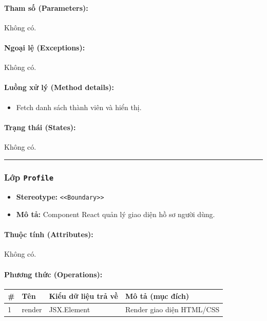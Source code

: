 \documentclass[12pt,a4paper]{article}
\begin{document}
\paragraph{Tham số (Parameters):}
Không có.

\paragraph{Ngoại lệ (Exceptions):}
Không có.

\paragraph{Luồng xử lý (Method details):}
\begin{itemize}[leftmargin=*]
    \item Fetch danh sách thành viên và hiển thị.
\end{itemize}


\paragraph{Trạng thái (States):}
Không có.

\vskip 0.5cm
\noindent\rule{\textwidth}{0.5pt}
\vskip 0.5cm

\subsubsection{Lớp \texttt{Profile}}
\begin{itemize}[leftmargin=*]
    \item \textbf{Stereotype:} \texttt{\textless{}\textless{}Boundary\textgreater{}\textgreater{}}
    \item \textbf{Mô tả:} Component React quản lý giao diện hồ sơ người dùng.
\end{itemize}

\paragraph{Thuộc tính (Attributes):}
Không có.

\paragraph{Phương thức (Operations):}
\begin{longtable}{|p{0.6cm}|p{3.8cm}|p{2.6cm}|p{6.5cm}|}
\hline
\textbf{\#} & \textbf{Tên} & \textbf{Kiểu dữ liệu trả về} & \textbf{Mô tả (mục đích)} \\ \hline
\endhead
1 & render & JSX.Element & Render giao diện HTML/CSS \\ \hline
\end{longtable}
\end{document}
